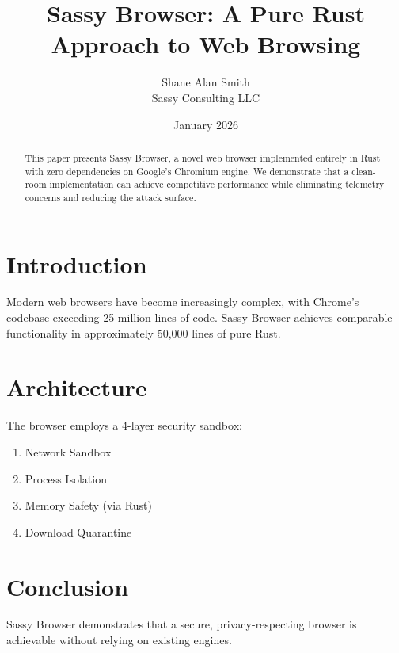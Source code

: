 \documentclass[11pt]{article}
\title{Sassy Browser: A Pure Rust Approach to Web Browsing}
\author{Shane Alan Smith \\ Sassy Consulting LLC}
\date{January 2026}
\begin{document}
\maketitle

\begin{abstract}
This paper presents Sassy Browser, a novel web browser implemented entirely 
in Rust with zero dependencies on Google's Chromium engine. We demonstrate 
that a clean-room implementation can achieve competitive performance while 
eliminating telemetry concerns and reducing the attack surface.
\end{abstract}

\section{Introduction}
Modern web browsers have become increasingly complex, with Chrome's codebase 
exceeding 25 million lines of code. Sassy Browser achieves comparable 
functionality in approximately 50,000 lines of pure Rust.

\section{Architecture}
The browser employs a 4-layer security sandbox:
\begin{enumerate}
    \item Network Sandbox
    \item Process Isolation
    \item Memory Safety (via Rust)
    \item Download Quarantine
\end{enumerate}

\section{Conclusion}
Sassy Browser demonstrates that a secure, privacy-respecting browser is 
achievable without relying on existing engines.
\end{document}
